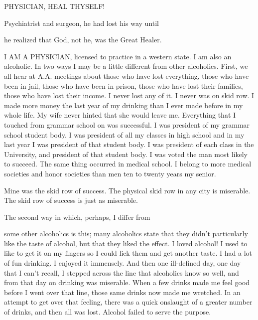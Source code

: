 
PHYSICIAN, HEAL THYSELF!

Psychiatrist and surgeon, he had lost his way until

he realized that God, not he, was the Great Healer.

       I AM A PHYSICIAN, licensed to practice in a western state. I am also an alcoholic. In two ways I may be a little different from other alcoholics. First, we all hear at A.A. meetings about those who have lost everything, those who have been in jail, those who have been in prison, those who have lost their families, those who have lost their income. I never lost any of it. I never was on skid row. I made more money the last year of my drinking than I ever made before in my whole life. My wife never hinted that she would leave me. Everything that I touched from grammar school on was successful. I was president of my grammar school student body. I was president of all my classes in high school and in my last year I was president of that student body. I was president of each class in the University, and president of that student body. I was voted the man most likely to succeed. The same thing occurred in medical school. I belong to more medical societies and honor societies than men ten to twenty years my senior.

Mine was the skid row of success. The physical skid row in any city is miserable. The skid row of success is just as miserable.

The second way in which, perhaps, I differ from

some other alcoholics is this; many alcoholics state that they didn’t particularly like the taste of alcohol, but that they liked the effect. I loved alcohol! I used to like to get it on my fingers so I could lick them and get another taste. I had a lot of fun drinking. I enjoyed it immensely. And then one ill-defined day, one day that I can’t recall, I stepped across the line that alcoholics know so well, and from that day on drinking was miserable. When a few drinks made me feel good before I went over that line, those same drinks now made me wretched. In an attempt to get over that feeling, there was a quick onslaught of a greater number of drinks, and then all was lost. Alcohol failed to serve the purpose.

